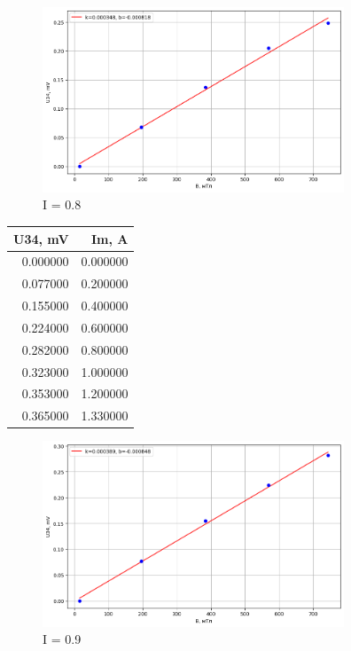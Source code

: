 \documentclass[a4paper, 12pt]{article}
\begin{document}
    \begin{figure}[h!]
        \centering
        \includegraphics[width=90mm]{./images/image copy 5.png}
        \caption{I = 0.8}
    \end{figure}
    \begin{table}[h!]
        \centering
    \begin{tabular}{rr}
        \toprule
        U34, mV & Im, A \\
        \midrule
        0.000000 & 0.000000 \\
        0.077000 & 0.200000 \\
        0.155000 & 0.400000 \\
        0.224000 & 0.600000 \\
        0.282000 & 0.800000 \\
        0.323000 & 1.000000 \\
        0.353000 & 1.200000 \\
        0.365000 & 1.330000 \\
        \bottomrule
        \end{tabular}
    \end{table}
    \newpage
        \begin{figure}[h!]
            \centering
            \includegraphics[width=90mm]{./images/image copy 6.png}
            \caption{I = 0.9}
        \end{figure}
\end{document}
